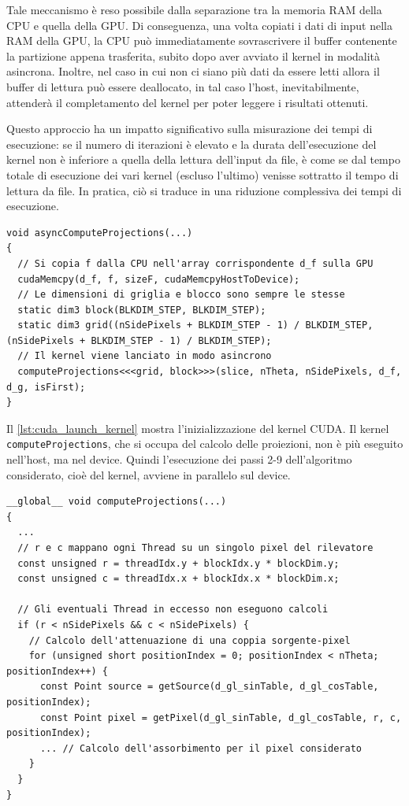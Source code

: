 \documentclass[12pt,a4paper]{report}
\begin{document}
Tale meccanismo è reso possibile dalla separazione tra la memoria RAM della CPU e quella della GPU.
Di conseguenza, una volta copiati i dati di input nella RAM della GPU, la CPU può immediatamente sovrascrivere il buffer
contenente la partizione appena trasferita, subito dopo aver avviato il kernel in modalità asincrona.
Inoltre, nel caso in cui non ci siano più dati da essere letti allora il buffer di lettura può essere deallocato, in tal caso
l'host, inevitabilmente, attenderà il completamento del kernel per poter leggere i risultati ottenuti.

Questo approccio ha un impatto significativo sulla misurazione dei tempi di esecuzione: se il numero di iterazioni è elevato e la
durata dell'esecuzione del kernel non è inferiore a quella della lettura dell'input da file, è come se dal tempo totale di
esecuzione dei vari kernel (escluso l'ultimo) venisse sottratto il tempo di lettura da file.
In pratica, ciò si traduce in una riduzione complessiva dei tempi di esecuzione.

\begin{lstlisting}[language=CStyle, caption={Codice CUDA-C per il lancio del kernel.}, label={lst:cuda_launch_kernel}]
void asyncComputeProjections(...)
{
  // Si copia f dalla CPU nell'array corrispondente d_f sulla GPU
  cudaMemcpy(d_f, f, sizeF, cudaMemcpyHostToDevice);
  // Le dimensioni di griglia e blocco sono sempre le stesse
  static dim3 block(BLKDIM_STEP, BLKDIM_STEP);
  static dim3 grid((nSidePixels + BLKDIM_STEP - 1) / BLKDIM_STEP, (nSidePixels + BLKDIM_STEP - 1) / BLKDIM_STEP);
  // Il kernel viene lanciato in modo asincrono
  computeProjections<<<grid, block>>>(slice, nTheta, nSidePixels, d_f, d_g, isFirst);
}
\end{lstlisting}

Il \autoref{lst:cuda_launch_kernel} mostra l'inizializzazione del kernel CUDA.
Il kernel \mbox{\lstinline{computeProjections},} che si occupa del calcolo delle proiezioni, non è più eseguito nell'host,
ma nel device.
Quindi l'esecuzione dei passi 2-9 dell'algoritmo considerato, cioè del kernel, avviene in parallelo sul device.

\begin{lstlisting}[language=CStyle, caption={Codice CUDA-C del kernel.}, label={lst:cuda_kernel}]
__global__ void computeProjections(...)
{
  ...
  // r e c mappano ogni Thread su un singolo pixel del rilevatore
  const unsigned r = threadIdx.y + blockIdx.y * blockDim.y;
  const unsigned c = threadIdx.x + blockIdx.x * blockDim.x;

  // Gli eventuali Thread in eccesso non eseguono calcoli
  if (r < nSidePixels && c < nSidePixels) {
    // Calcolo dell'attenuazione di una coppia sorgente-pixel
    for (unsigned short positionIndex = 0; positionIndex < nTheta; positionIndex++) {
      const Point source = getSource(d_gl_sinTable, d_gl_cosTable, positionIndex);
      const Point pixel = getPixel(d_gl_sinTable, d_gl_cosTable, r, c, positionIndex);
      ... // Calcolo dell'assorbimento per il pixel considerato
    }
  }
}
\end{lstlisting}
\end{document}
